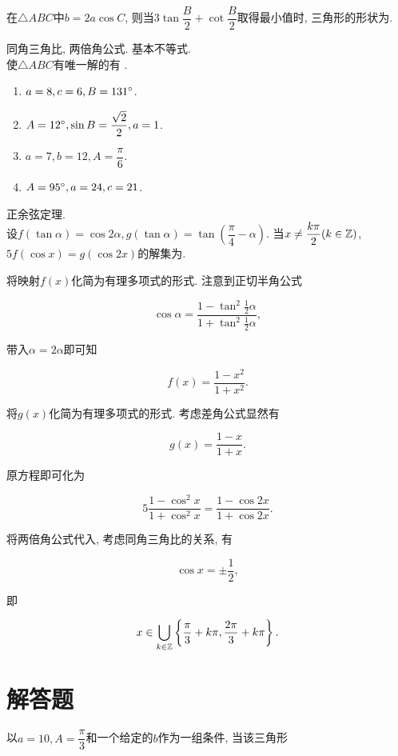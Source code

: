 \documentclass[8pt]{article}
\begin{document}
		 在$\triangle ABC$中$b=2a\cos C$, 则当$3\tan \dfrac{B}{2} + \cot \dfrac{B}{2}$取得最小值时, 三角形的形状为.

		同角三角比, 两倍角公式. 基本不等式.
		~\\

		 使$\triangle ABC$有唯一解的有 .
			\begin{enumerate}[label=(\arabic*)]
				\item $a=8, c=6, B=131^\circ$.
				\item $A=12^\circ, \sin B=\dfrac{\sqrt{2}}{2}, a=1$.
				\item $a=7, b=12, A=\dfrac{\pi}{6}$.
				\item $A=95^\circ, a=24, c=21$.
			\end{enumerate}

		正余弦定理.
		~\\

		设$f(\tan \alpha)=\cos 2\alpha, g(\tan \alpha)=\tan \left(\dfrac{\pi}{4} - \alpha \right).$ 当$x\neq \dfrac{k\pi}{2} (k\in \mathbb{Z})$, $5f(\cos x)=g(\cos 2x)$的解集为.

		 将映射$f(x)$化简为有理多项式的形式. 注意到正切半角公式

		$$\cos \alpha = \frac{1-\tan^2 \frac{1}{2} \alpha}{1+\tan^2 \frac{1}{2} \alpha},$$

		带入$\alpha = 2\alpha$即可知

		$$f(x)=\frac{1-x^2}{1+x^2}.$$

		将$g(x)$化简为有理多项式的形式. 考虑差角公式显然有

		$$g(x)=\frac{1-x}{1+x}.$$

		原方程即可化为

		$$5 \frac{1 - \cos^2 x}{1 + \cos^2 x} = \frac{1 - \cos 2x}{1 + \cos 2x}.$$

		将两倍角公式代入, 考虑同角三角比的关系, 有

		$$\cos x = \pm \frac{1}{2},$$

		即

		$$x \in \bigcup_{k\in \mathbb{Z}} \left\{\frac{\pi}{3}+k\pi, \frac{2\pi}{3}+k\pi\right\}.$$

	\section{解答题}
		以$a=10, A=\dfrac{\pi}{3}$和一个给定的$b$作为一组条件, 当该三角形
\end{document}
